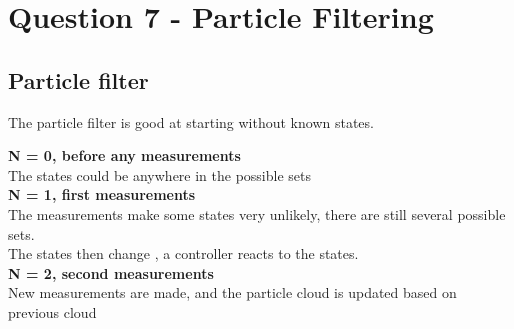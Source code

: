 \chapter{Question 7 - Particle Filtering}

\section{Particle filter} %
\label{sec:particle_filter}
The particle filter is good at starting without known states.

\textbf{N = 0, before any measurements} \\
The states could be anywhere in the possible sets \\
\textbf{N = 1, first measurements} \\
The measurements make some states very unlikely, there are still several possible sets. \\
The states then change , a controller reacts to the states. \\
\textbf{N = 2, second measurements} \\
New measurements are made, and the particle cloud is updated based on previous cloud \\



